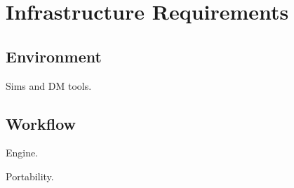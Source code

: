 \section{Infrastructure Requirements}
\def\secname{\chpname:infrastructure}
\label{\secname}



\subsection{Environment}

Sims and DM tools.


\subsection{Workflow}

Engine.

Portability.

